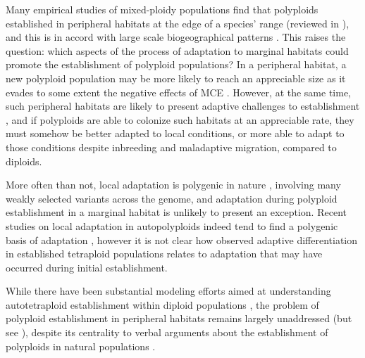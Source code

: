 \documentclass[12pt,a4paper]{article}
\begin{document}
    Many empirical studies of mixed-ploidy populations find that polyploids
    established in peripheral habitats at the edge of a species' range (reviewed in
    \cite{griswold2021}), and this is in accord with large scale biogeographical
    patterns \citep{rice2019}.
    This raises the question: which aspects of the process of adaptation to marginal
    habitats could promote the establishment of polyploid populations?
    In a peripheral habitat, a new polyploid population may be more likely to reach
    an appreciable size as it evades to some extent the negative effects of MCE
    \citep{levin1975}.
    However, at the same time, such peripheral habitats are likely to present
    adaptive challenges to establishment
    \citep{kawecki2008adaptation,sachdeva2022b}, and if polyploids are able to
    colonize such habitats at an appreciable rate, they must somehow be better
    adapted to local conditions, or more able to adapt to those conditions despite
    inbreeding and maladaptive migration, compared to diploids.

    More often than not, local adaptation is polygenic in nature
    \citep{pritchard2010,barghi2020,bomblies2022}, involving many weakly selected
    variants across the genome, and adaptation during polyploid establishment
    in a marginal habitat is unlikely to present an exception.
    Recent studies on local adaptation in autopolyploids indeed tend to find a
    polygenic basis of adaptation \citep{bohutinska2021,konevcna2021,konevcna2022},
    however it is not clear how observed adaptive differentiation in established
    tetraploid populations relates to adaptation that may have occurred during
    initial establishment.

    While there have been substantial modeling efforts aimed at understanding
    autotetraploid establishment within diploid populations \citep{levin1975,
    felber1991, felber1997, rausch2005, oswald2011, clo2022c}, the problem of
    polyploid establishment in peripheral habitats remains largely unaddressed
    (but see \cite{griswold2021}),
    despite its centrality to verbal arguments about the establishment of
    polyploids in natural populations \citep{kolar2017, vandepeer2021, clo2022d}.
    
\end{document}
